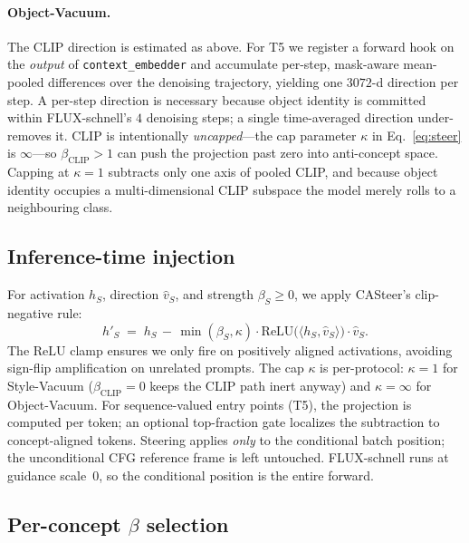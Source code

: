 \documentclass{article}
\begin{document}
\paragraph{Object-Vacuum.} The CLIP direction is estimated as above.
For T5 we register a forward hook on the \emph{output} of
\texttt{context\_embedder} and accumulate per-step, mask-aware
mean-pooled differences over the denoising trajectory, yielding one
$3072$-d direction per step. A per-step direction is necessary
because object identity is committed within FLUX-schnell's $4$
denoising steps; a single time-averaged direction under-removes it.
CLIP is intentionally \emph{uncapped}---the cap parameter $\kappa$ in
Eq.~\ref{eq:steer} is $\infty$---so $\beta_{\mathrm{CLIP}}\!>\!1$ can
push the projection past zero into anti-concept space. Capping at
$\kappa{=}1$ subtracts only one axis of pooled CLIP, and because
object identity occupies a multi-dimensional CLIP subspace the model
merely rolls to a neighbouring class.

\subsection{Inference-time injection}
\label{sec:method_inject}

For activation $h_S$, direction $\hat v_S$, and strength
$\beta_S\!\geq\!0$, we apply CASteer's clip-negative rule:
\begin{equation}
\label{eq:steer}
h'_S \;=\; h_S \,-\, \min(\beta_S, \kappa)\cdot\mathrm{ReLU}\!\bigl(\langle h_S, \hat v_S\rangle\bigr) \cdot \hat v_S.
\end{equation}
The $\mathrm{ReLU}$ clamp ensures we only fire on positively aligned
activations, avoiding sign-flip amplification on unrelated prompts.
The cap $\kappa$ is per-protocol: $\kappa{=}1$ for Style-Vacuum
($\beta_{\mathrm{CLIP}}{=}0$ keeps the CLIP path inert anyway) and
$\kappa{=}\infty$ for Object-Vacuum. For sequence-valued entry points
(T5), the projection is computed per token; an optional top-fraction
gate localizes the subtraction to concept-aligned tokens. Steering
applies \emph{only} to the conditional batch position; the
unconditional CFG reference frame is left untouched. FLUX-schnell
runs at guidance scale~$0$, so the conditional position is the entire
forward.

\subsection{Per-concept $\beta$ selection}
\label{sec:method_hp}
\end{document}
